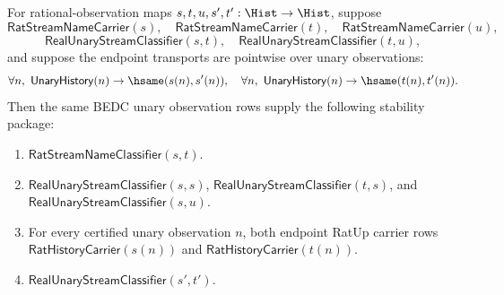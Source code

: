 \begin{theorem}
\label{thm:real-unary-stream-classifier-stability-package}
For rational-observation maps $s,t,u,s',t':\Hist\to\Hist$, suppose
$$
\mathsf{RatStreamNameCarrier}(s),\quad
\mathsf{RatStreamNameCarrier}(t),\quad
\mathsf{RatStreamNameCarrier}(u),
$$
$$
\mathsf{RealUnaryStreamClassifier}(s,t),\quad
\mathsf{RealUnaryStreamClassifier}(t,u),
$$
and suppose the endpoint transports are pointwise over unary observations:
$$
\forall n,\ \mathsf{UnaryHistory}(n)\to\hsame(s(n),s'(n)),
\quad
\forall n,\ \mathsf{UnaryHistory}(n)\to\hsame(t(n),t'(n)).
$$
Then the same BEDC unary observation rows supply the following stability
package:
\begin{enumerate}
  \item $\mathsf{RatStreamNameClassifier}(s,t)$.
  \item $\mathsf{RealUnaryStreamClassifier}(s,s)$,
  $\mathsf{RealUnaryStreamClassifier}(t,s)$, and
  $\mathsf{RealUnaryStreamClassifier}(s,u)$.
  \item For every certified unary observation $n$, both endpoint RatUp carrier
  rows $\mathsf{RatHistoryCarrier}(s(n))$ and
  $\mathsf{RatHistoryCarrier}(t(n))$.
  \item $\mathsf{RealUnaryStreamClassifier}(s',t')$.
\end{enumerate}
\end{theorem}
